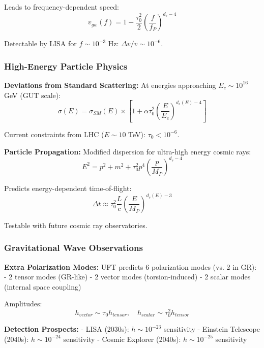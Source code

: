 \documentclass[12pt,a4paper]{article}
\begin{document}
Leads to frequency-dependent speed:
\begin{equation}
    v_{gw}(f) = 1 - \frac{\tau_0^2}{2}\left(\frac{f}{f_P}\right)^{d_s-4}
\end{equation}

Detectable by LISA for $f \sim 10^{-3}$ Hz: $\Delta v/v \sim 10^{-6}$.

\subsubsection{High-Energy Particle Physics}

\textbf{Deviations from Standard Scattering:}
At energies approaching $E_c \sim 10^{16}$ GeV (GUT scale):
\begin{equation}
    \sigma(E) = \sigma_{SM}(E) \times \left[1 + \alpha \tau_0^2 \left(\frac{E}{E_c}\right)^{d_s(E)-4}\right]
\end{equation}

Current constraints from LHC ($E \sim 10$ TeV): $\tau_0 < 10^{-6}$.

\textbf{Particle Propagation:}
Modified dispersion for ultra-high energy cosmic rays:
\begin{equation}
    E^2 = p^2 + m^2 + \tau_0^2 p^4 \left(\frac{p}{M_P}\right)^{d_s-4}
\end{equation}

Predicts energy-dependent time-of-flight:
\begin{equation}
    \Delta t \approx \tau_0^2 \frac{L}{c} \left(\frac{E}{M_P}\right)^{d_s(E)-3}
\end{equation}

Testable with future cosmic ray observatories.

\subsubsection{Gravitational Wave Observations}

\textbf{Extra Polarization Modes:}
UFT predicts 6 polarization modes (vs. 2 in GR):
- 2 tensor modes (GR-like)
- 2 vector modes (torsion-induced)
- 2 scalar modes (internal space coupling)

Amplitudes:
\begin{equation}
    h_{vector} \sim \tau_0 h_{tensor}, \quad h_{scalar} \sim \tau_0^2 h_{tensor}
\end{equation}

\textbf{Detection Prospects:}
- LISA (2030s): $h \sim 10^{-23}$ sensitivity
- Einstein Telescope (2040s): $h \sim 10^{-24}$ sensitivity
- Cosmic Explorer (2040s): $h \sim 10^{-25}$ sensitivity
\end{document}

